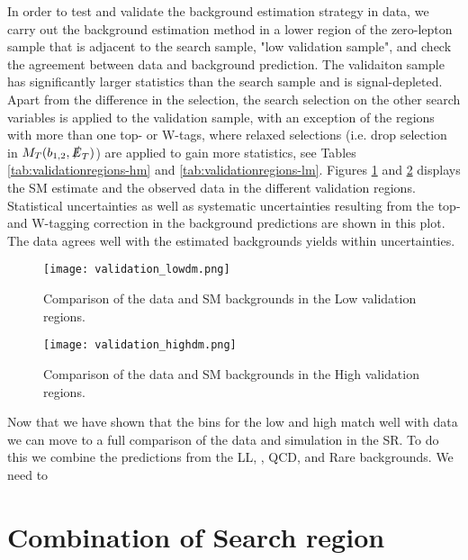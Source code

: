 In order to test and validate the background estimation strategy in data, we carry out the background estimation method in a lower \met{} region of the zero-lepton sample that is adjacent to the search sample, "low \met{} validation sample", and check the agreement between data and background prediction. The validaiton sample has significantly larger statistics than the search sample and is signal-depleted. Apart from the difference in the \met{} selection, the search selection on the other search variables is applied to the validation sample, with an exception of the regions with more than one top- or W-tags, where relaxed selections (i.e. drop selection in $M_T(b_{1,2},\slashed{E}_{T})$) are applied to gain more statistics, see Tables \ref{tab:validationregions-hm} and \ref{tab:validationregions-lm}. Figures \ref{fig:validation-region-lm} and \ref{fig:validation-region-hm} displays the SM estimate and the observed data in the different validation regions. Statistical uncertainties as well as systematic uncertainties resulting from the top- and W-tagging correction in the background predictions are shown in this plot. The data agrees well with the estimated backgrounds yields within uncertainties. 

\begin{figure}
	\begin{center}
  \texttt{[image: validation\_lowdm.png]}
	\end{center}
	\caption[LM Validation Region]{Comparison of the data and SM backgrounds in the Low \dm{} validation regions.
	 }
	\label{fig:validation-region-lm}
\end{figure}

\begin{figure}
	\begin{center}
  \texttt{[image: validation\_highdm.png]}
	\end{center}
	\caption[Lost Lepton HM Control Region]{Comparison of the data and SM backgrounds in the High \dm{} validation regions.
	 }
	\label{fig:validation-region-hm}
\end{figure}

Now that we have shown that the bins for the low and high \dm{} match well with data we can move to a full comparison of the data and simulation in the SR. To do this we combine the predictions from the LL, \Znunu, QCD, and Rare backgrounds. We need to 

\section{Combination of Search region}\label{sec:Combination}

